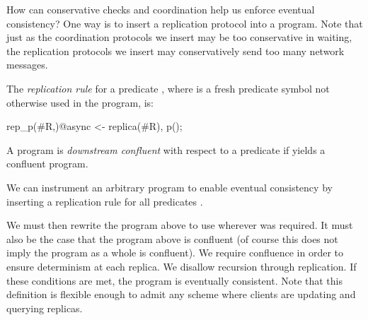 
How can conservative checks and coordination help us enforce eventual consistency?  One way is to insert a  replication protocol into a \lang program.  Note that just as  the coordination protocols we insert may be too conservative in waiting, the replication protocols we insert may conservatively send too many network messages.  


\begin{definition}
The {\em replication rule} for a predicate , where  is a fresh predicate symbol not otherwise used in the program, is:

\begin{Dedalus}
rep_p(#R,)@async <- replica(#R), p();
\end{Dedalus}
\end{definition}

\begin{definition}
A program is {\em downstream confluent} with respect to a predicate  if  yields a confluent program.
\end{definition} 

We can instrument an arbitrary \lang program to enable eventual consistency by inserting a replication rule for all predicates .


We must then rewrite the program above  to use  wherever  was required.  It must also be the case that the program above  is confluent (of course this does not imply the program as a whole is confluent).    We require confluence in order to ensure determinism at each replica.  We disallow recursion through replication.  If these conditions are met, the program is eventually consistent.  Note that this definition is flexible enough to admit any scheme where clients are updating and querying replicas.  

